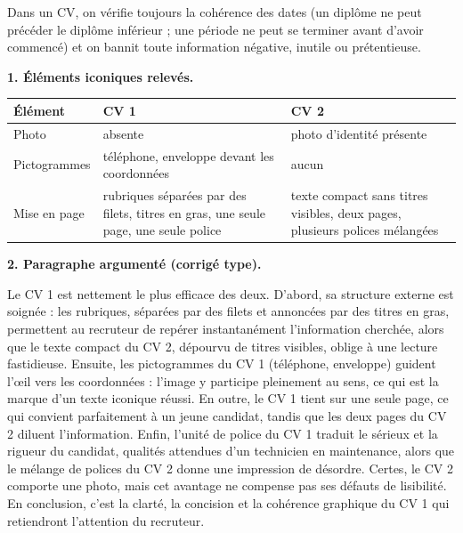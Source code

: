 \documentclass[11pt]{article}
\begin{document}
\begin{attention}
Dans un CV, on vérifie toujours la cohérence des dates (un diplôme ne peut précéder le diplôme inférieur ; une période ne peut se terminer avant d'avoir commencé) et on bannit toute information négative, inutile ou prétentieuse.
\end{attention}

\begin{corrige}
\textbf{1. Éléments iconiques relevés.}

\begin{center}
\begin{tabularx}{\linewidth}{|l|X|X|}
\hline
\rowcolor{popblueL} Élément & CV 1 & CV 2 \\
\hline
Photo & absente & photo d'identité présente \\
\hline
Pictogrammes & téléphone, enveloppe devant les coordonnées & aucun \\
\hline
Mise en page & rubriques séparées par des filets, titres en gras, une seule page, une seule police & texte compact sans titres visibles, deux pages, plusieurs polices mélangées \\
\hline
\end{tabularx}
\end{center}

\textbf{2. Paragraphe argumenté (corrigé type).}

Le CV 1 est nettement le plus efficace des deux. D'abord, sa structure externe est soignée : les rubriques, séparées par des filets et annoncées par des titres en gras, permettent au recruteur de repérer instantanément l'information cherchée, alors que le texte compact du CV 2, dépourvu de titres visibles, oblige à une lecture fastidieuse. Ensuite, les pictogrammes du CV 1 (téléphone, enveloppe) guident l'œil vers les coordonnées : l'image y participe pleinement au sens, ce qui est la marque d'un texte iconique réussi. En outre, le CV 1 tient sur une seule page, ce qui convient parfaitement à un jeune candidat, tandis que les deux pages du CV 2 diluent l'information. Enfin, l'unité de police du CV 1 traduit le sérieux et la rigueur du candidat, qualités attendues d'un technicien en maintenance, alors que le mélange de polices du CV 2 donne une impression de désordre. Certes, le CV 2 comporte une photo, mais cet avantage ne compense pas ses défauts de lisibilité. En conclusion, c'est la clarté, la concision et la cohérence graphique du CV 1 qui retiendront l'attention du recruteur.
\end{corrige}
\end{document}
